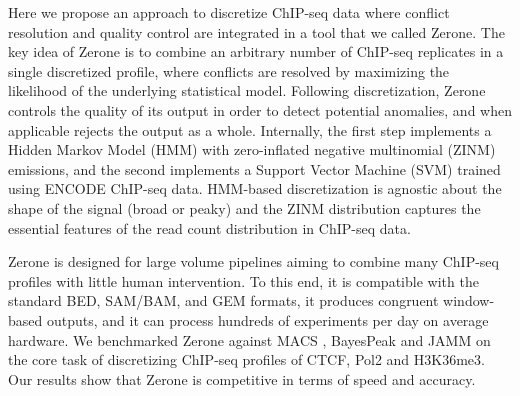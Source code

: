 \documentclass{bioinfo}
\begin{document}
Here we propose an approach to discretize ChIP-seq data where conflict
resolution and quality control are integrated in a tool that we called
Zerone. The key idea of Zerone is to combine an arbitrary number of
ChIP-seq replicates in a single discretized profile, where conflicts are
resolved by maximizing the likelihood of the underlying statistical model.
Following discretization, Zerone controls the quality of its output in
order to detect potential anomalies, and when applicable rejects the
output as a whole. Internally, the first step implements a Hidden Markov
Model (HMM) with zero-inflated negative multinomial (ZINM) emissions, and
the second implements a Support Vector Machine (SVM) trained using ENCODE
ChIP-seq data. HMM-based discretization is agnostic about
the shape of the signal (broad or peaky) and the ZINM distribution captures
the essential features of the read count distribution in ChIP-seq data.

Zerone is designed for large volume pipelines aiming to combine many
ChIP-seq profiles with little human intervention. To this end, it is
compatible with the standard BED, SAM/BAM, and GEM formats,
it produces congruent window-based outputs, and it can process hundreds
of experiments per day on average hardware. We benchmarked Zerone against
MACS \citep{pmid18798982}, BayesPeak \citep{pmid19772557} and
JAMM \citep{pmid25223640} on the core task of discretizing ChIP-seq
profiles of CTCF, Pol2 and H3K36me3. Our results show that Zerone is
competitive in terms of speed and accuracy.
\end{document}

